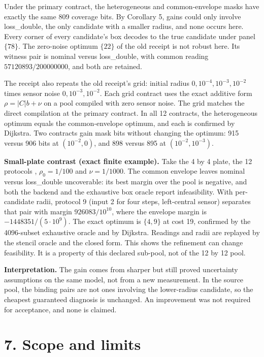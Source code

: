 \documentclass[
  11pt,
  a4paper,
]{report}
\let\singularitytexttt\texttt
\renewcommand{\texttt}[1]{\singularitytexttt{\seqsplit{#1}}}
\begin{document}
Under the primary contract, the heterogeneous and common-envelope masks
have exactly the same 809 coverage bits. By Corollary 5, gains could
only involve loss\_double, the only candidate with a smaller radius, and
none occurs here. Every corner of every candidate's box decodes to the
true candidate under panel \(\{78\}\). The zero-noise optimum \(\{22\}\)
of the old receipt is not robust here. Its witness pair is nominal
versus loss\_double, with common reading \(57120893/200000000\), and
both are retained.

The receipt also repeats the old receipt's grid: initial radius
\(0,10^{-4},10^{-3},10^{-2}\) times sensor noise \(0,10^{-3},10^{-2}\).
Each grid contract uses the exact additive form \(\rho=|C|b+\nu\) on a
pool compiled with zero sensor noise. The grid matches the direct
compilation at the primary contract. In all 12 contracts, the
heterogeneous optimum equals the common-envelope optimum, and each is
confirmed by Dijkstra. Two contracts gain mask bits without changing the
optimum: 915 versus 906 bits at \((10^{-2},0)\), and 898 versus 895 at
\((10^{-2},10^{-3})\).

\textbf{Small-plate contrast (exact finite example).} Take the 4 by 4
plate, the 12 protocols
\texttt{default\_protocols((1,2,3,4,6,8)){[}1::5{]}{[}:12{]}},
\(\rho_0=1/100\) and \(\nu=1/1000\). The common envelope leaves nominal
versus loss\_double uncoverable: its best margin over the pool is
negative, and both the backend and the exhaustive box oracle report
infeasibility. With per-candidate radii, protocol 9 (input 2 for four
steps, left-central sensor) separates that pair with margin
\(926083/10^{10}\), where the envelope margin is
\(-1448351/(5\cdot10^9)\). The exact optimum is \(\{4,9\}\) at cost 19,
confirmed by the 4096-subset exhaustive oracle and by Dijkstra. Readings
and radii are replayed by the stencil oracle and the closed form. This
shows the refinement can change feasibility. It is a property of this
declared sub-pool, not of the 12 by 12 pool.

\textbf{Interpretation.} The gain comes from sharper but still proved
uncertainty assumptions on the same model, not from a new measurement.
In the source pool, the binding pairs are not ones involving the
lower-radius candidate, so the cheapest guaranteed diagnosis is
unchanged. An improvement was not required for acceptance, and none is
claimed.

\hypertarget{scope-and-limits}{%
\section{7. Scope and limits}\label{scope-and-limits}}
\end{document}
